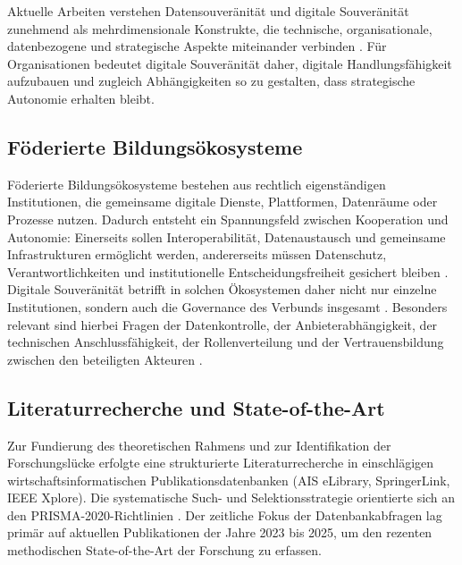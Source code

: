\documentclass[10pt,a4paper]{article}
\begin{document}
Aktuelle Arbeiten verstehen Datensouveränität und digitale Souveränität zunehmend als mehrdimensionale Konstrukte, die technische, organisationale, datenbezogene und strategische Aspekte miteinander verbinden \cite{Ab24,SHO24}. Für Organisationen bedeutet digitale Souveränität daher, digitale Handlungsfähigkeit aufzubauen und zugleich Abhängigkeiten so zu gestalten, dass strategische Autonomie erhalten bleibt.

\subsection{Föderierte Bildungsökosysteme}

Föderierte Bildungsökosysteme bestehen aus rechtlich eigenständigen Institutionen, die gemeinsame digitale Dienste, Plattformen, Datenräume oder Prozesse nutzen. Dadurch entsteht ein Spannungsfeld zwischen Kooperation und Autonomie: Einerseits sollen Interoperabilität, Datenaustausch und gemeinsame Infrastrukturen ermöglicht werden, andererseits müssen Datenschutz, Verantwortlichkeiten und institutionelle Entscheidungsfreiheit gesichert bleiben \cite{OE23,Ab24}. Digitale Souveränität betrifft in solchen Ökosystemen daher nicht nur einzelne Institutionen, sondern auch die Governance des Verbunds insgesamt \cite{Op25,OJ19}. Besonders relevant sind hierbei Fragen der Datenkontrolle, der Anbieterabhängigkeit, der technischen Anschlussfähigkeit, der Rollenverteilung und der Vertrauensbildung zwischen den beteiligten Akteuren \cite{BM24a,BM24b,BT24,Ga23,ID23,Ze26}.

\subsection{Literaturrecherche und State-of-the-Art}

Zur Fundierung des theoretischen Rahmens und zur Identifikation der Forschungslücke erfolgte eine strukturierte Literaturrecherche in einschlägigen wirtschaftsinformatischen Publikationsdatenbanken (AIS eLibrary, SpringerLink, IEEE Xplore). Die systematische Such- und Selektionsstrategie orientierte sich an den PRISMA-2020-Richtlinien \cite{Pa21}. Der zeitliche Fokus der Datenbankabfragen lag primär auf aktuellen Publikationen der Jahre 2023 bis 2025, um den rezenten methodischen State-of-the-Art der Forschung zu erfassen.
\end{document}
